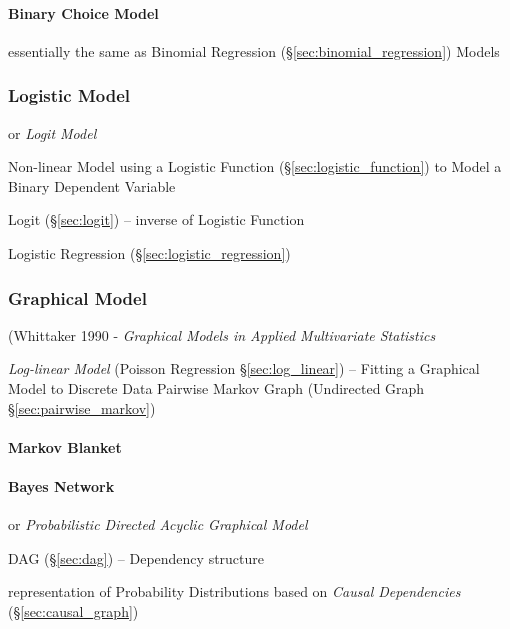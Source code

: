 \paragraph{Binary Choice Model}\label{sec:binary_choice}\hfill

essentially the same as Binomial Regression
(\S\ref{sec:binomial_regression}) Models



\subsubsection{Logistic Model}\label{sec:discrete_uniform_law}

or \emph{Logit Model}

Non-linear Model using a Logistic Function (\S\ref{sec:logistic_function}) to
Model a Binary Dependent Variable

Logit (\S\ref{sec:logit}) -- inverse of Logistic Function

Logistic Regression (\S\ref{sec:logistic_regression})



\subsubsection{Graphical Model}\label{sec:graphical_model}

(Whittaker 1990 - \emph{Graphical Models in Applied Multivariate Statistics}

\fist \emph{Log-linear Model} (Poisson Regression \S\ref{sec:log_linear}) --
Fitting a Graphical Model to Discrete Data \fist Pairwise Markov Graph
(Undirected Graph \S\ref{sec:pairwise_markov})



\paragraph{Markov Blanket}\label{sec:markov_blanket}\hfill

\paragraph{Bayes Network}\label{sec:bayes_network}\hfill

or \emph{Probabilistic Directed Acyclic Graphical Model}

DAG (\S\ref{sec:dag}) -- Dependency structure

representation of Probability Distributions based on \emph{Causal Dependencies}
(\S\ref{sec:causal_graph})


